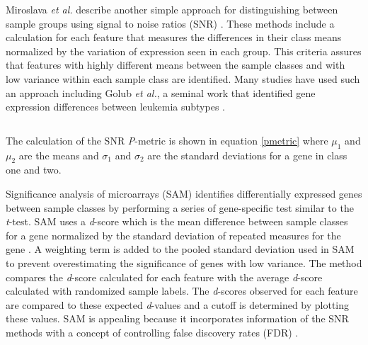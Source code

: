 {Miroslava \emph{et al.} describe another simple approach for distinguishing
between sample groups using signal to noise ratios (SNR)
\cite{PMID_164182572,PMID_12933571,yeang2001mcm,PMID_12384549}.  These methods
include a calculation for each feature that measures the differences in their
class means normalized by the variation of expression seen in each group.  This
criteria assures that features with highly different means between the sample
classes and with low variance within each sample class are identified.  Many
studies have used such an approach including Golub \emph{et al.}, a seminal
work that identified gene expression differences between leukemia subtypes
\cite{PMID_164182572,PMID_12933571,yeang2001mcm,PMID_12933571}.

\begin{equation}\label{pmetric}
\end{equation}

The calculation of the SNR \emph{P}-metric is shown in equation \eqref{pmetric}
where $\mu_1$ and $\mu_2$ are the means and $\sigma_1$ and $\sigma_2$ are the
standard deviations for a gene in class one and two.


Significance analysis of microarrays (SAM) identifies differentially expressed
genes between sample classes by performing a series of gene-specific test
similar to the \emph{t}-test.  SAM uses a \emph{d}-score which is the mean
difference between sample classes for a gene normalized by the standard
deviation of repeated measures for the gene \cite{tusher2001sam}.  A weighting
term is added to the pooled standard deviation used in SAM to prevent
overestimating the significance of genes with low variance.  The method
compares the \emph{d}-score calculated for each feature with the average
\emph{d}-score calculated with randomized sample labels.  The \emph{d}-scores
observed for each feature are compared to these expected \emph{d}-values and a
cutoff is determined by plotting these values. SAM is appealing because it
incorporates information of the SNR methods with a concept of controlling false
discovery rates (FDR) \cite{efron2001eba}.

% 
% 

}
